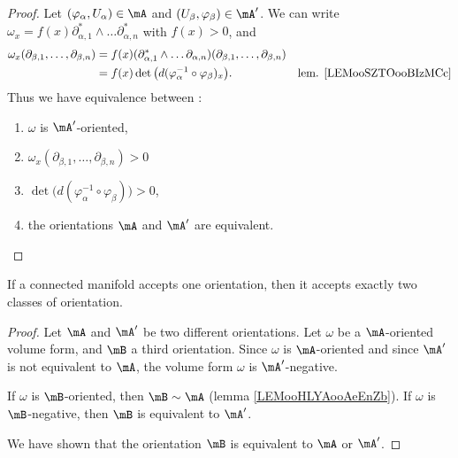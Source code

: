 \begin{proof}
	Let \( (\varphi_{\alpha}, U_{\alpha})\in\mA\) and \( (U_{\beta},\varphi_{\beta})\in\mA'\). We can write \( \omega_x=f(x)\partial^*_{\alpha,1}\wedge\ldots\partial_{\alpha,n}^*\) with \( f(x)>0\), and
	\begin{subequations}
		\begin{align}
			\omega_x(\partial_{\beta,1},\ldots,\partial_{\beta,n}) & =f(x)(\partial^*_{\alpha,1}\wedge\ldots\partial_{\alpha,n})(\partial_{\beta,1},\ldots,\partial_{\beta,n})                                       \\
			                                                       & =f(x)\det\big( d(\varphi_{\alpha}^{-1}\circ \varphi_{\beta})_x \big).                                     & \text{lem. \ref{LEMooSZTOooBIzMCc}}
		\end{align}
	\end{subequations}
	Thus we have equivalence between :
	\begin{enumerate}
		\item
		      \( \omega\) is \( \mA'\)-oriented,
		\item
		      \( \omega_x(\partial_{\beta,1},\ldots,\partial_{\beta,n})>0\)
		\item
		      $\det\big( d(\varphi_{\alpha}^{-1}\circ\varphi_{\beta}) \big)>0$,
		\item
		      the orientations \( \mA\) and \( \mA'\) are equivalent.
	\end{enumerate}
\end{proof}

\begin{proposition}		\label{PROPooNCNJooHFngBW}
	If a connected manifold accepts one orientation, then it accepts exactly two classes of orientation.
\end{proposition}

\begin{proof}
	Let \( \mA\) and \( \mA'\) be two different orientations. Let \( \omega\) be a \( \mA\)-oriented volume form, and \( \mB\) a third orientation. Since \( \omega\) is \( \mA\)-oriented and since \( \mA'\) is not equivalent to \( \mA\), the volume form \( \omega\) is \( \mA'\)-negative.


	If \( \omega\) is \( \mB\)-oriented, then \( \mB\sim\mA\) (lemma \ref{LEMooHLYAooAeEnZb}). If \( \omega\) is \( \mB\)-negative, then \( \mB\) is equivalent to \( \mA'\).

	We have shown that the orientation \( \mB\) is equivalent to \( \mA\) or \( \mA'\).
\end{proof}

